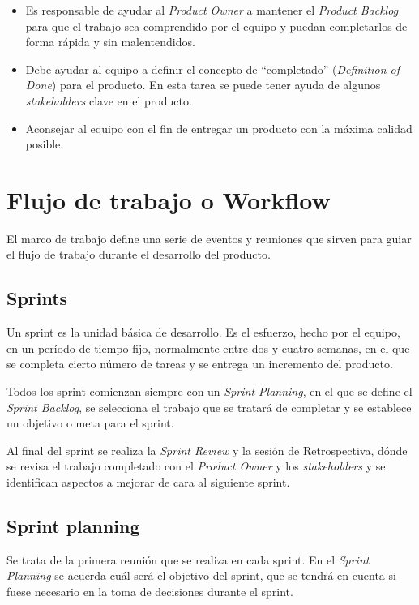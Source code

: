 \begin{itemize}
\item Es responsable de ayudar al \emph{Product Owner} a mantener el \emph{Product Backlog} para que el trabajo sea comprendido por el equipo y puedan completarlos de forma rápida y sin malentendidos.
\item Debe ayudar al equipo a definir el concepto de ``completado'' (\emph{Definition of Done}) para el producto. En esta tarea se puede tener ayuda de algunos \emph{stakeholders} clave en el producto.
\item Aconsejar al equipo con el fin de entregar un producto con la máxima calidad posible.
\end{itemize}



\section{Flujo de trabajo o Workflow}
\label{workflow}

El marco de trabajo define una serie de eventos y reuniones que sirven para guiar el flujo de trabajo durante el desarrollo del producto.

\subsection{Sprints}
\label{sprints}

Un sprint es la unidad básica de desarrollo. Es el esfuerzo, hecho por el equipo, en un período de tiempo fijo, normalmente entre dos y cuatro semanas, en el que se completa cierto número de tareas y se entrega un incremento del producto.

Todos los sprint comienzan siempre con un \emph{Sprint Planning}, en el que se define el \emph{Sprint Backlog}, se selecciona el trabajo que se tratará de completar y se establece un objetivo o meta para el sprint.

Al final del sprint se realiza la \emph{Sprint Review} y la sesión de Retrospectiva, dónde se revisa el trabajo completado con el \emph{Product Owner} y los \emph{stakeholders} y se identifican aspectos a mejorar de cara al siguiente sprint.

\subsection{Sprint planning}
\label{sprintPlanning}

Se trata de la primera reunión que se realiza en cada sprint. En el \emph{Sprint Planning} se acuerda cuál será el objetivo del sprint, que se tendrá en cuenta si fuese necesario en la toma de decisiones durante el sprint.

